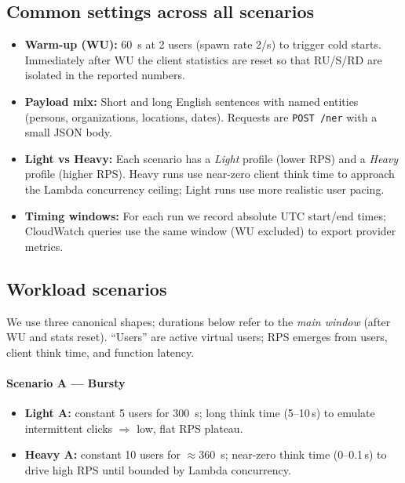 \documentclass[11pt,a4paper]{article}
\begin{document}
\subsection{Common settings across all scenarios}
\begin{itemize}
  \item \textbf{Warm-up (WU):} \SI{60}{s} at 2 users (spawn rate 2/s) to trigger cold starts. Immediately after WU the client statistics are reset so that RU/S/RD are isolated in the reported numbers.
  \item \textbf{Payload mix:} Short and long English sentences with named entities (persons, organizations, locations, dates). Requests are \texttt{POST /ner} with a small JSON body.
  \item \textbf{Light vs Heavy:} Each scenario has a \emph{Light} profile (lower RPS) and a \emph{Heavy} profile (higher RPS). Heavy runs use near-zero client think time to approach the Lambda concurrency ceiling; Light runs use more realistic user pacing.
  \item \textbf{Timing windows:} For each run we record absolute UTC start/end times; CloudWatch queries use the same window (WU excluded) to export provider metrics.
\end{itemize}

\subsection{Workload scenarios}
We use three canonical shapes; durations below refer to the \emph{main window} (after WU and stats reset). ``Users'' are active virtual users; RPS emerges from users, client think time, and function latency.

\paragraph{Scenario A — Bursty}
\begin{itemize}
  \item \textbf{Light A:} constant 5 users for \SI{300}{s}; long think time (5–10\,s) to emulate intermittent clicks $\Rightarrow$ low, flat RPS plateau.
  \item \textbf{Heavy A:} constant 10 users for $\approx$\SI{360}{s}; near-zero think time (0–0.1\,s) to drive high RPS until bounded by Lambda concurrency.
\end{itemize}
\end{document}
